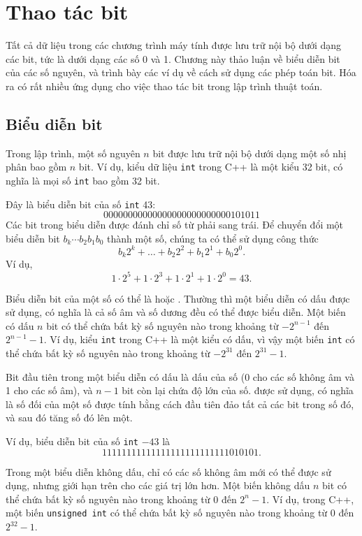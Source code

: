 \chapter{Thao tác bit}

Tất cả dữ liệu trong các chương trình máy tính được lưu trữ nội bộ dưới dạng các bit,
tức là dưới dạng các số 0 và 1.
Chương này thảo luận về biểu diễn bit
của các số nguyên, và trình bày các ví dụ
về cách sử dụng các phép toán bit.
Hóa ra có rất nhiều ứng dụng cho
việc thao tác bit trong lập trình thuật toán.

\section{Biểu diễn bit}


Trong lập trình, một số nguyên $n$ bit được lưu trữ nội bộ
dưới dạng một số nhị phân bao gồm $n$ bit.
Ví dụ, kiểu dữ liệu \texttt{int} trong C++ là
một kiểu 32 bit, có nghĩa là mọi số \texttt{int}
bao gồm 32 bit.

Đây là biểu diễn bit của
số \texttt{int} 43:
\[00000000000000000000000000101011\]
Các bit trong biểu diễn được đánh chỉ số từ phải sang trái.
Để chuyển đổi một biểu diễn bit $b_k \cdots b_2 b_1 b_0$ thành một số,
chúng ta có thể sử dụng công thức
\[b_k 2^k + \ldots + b_2 2^2 + b_1 2^1 + b_0 2^0.\]
Ví dụ,
\[1 \cdot 2^5 + 1 \cdot 2^3 + 1 \cdot 2^1 + 1 \cdot 2^0 = 43.\]

Biểu diễn bit của một số có thể là
 hoặc .
Thường thì một biểu diễn có dấu được sử dụng,
có nghĩa là cả số âm và số dương
đều có thể được biểu diễn.
Một biến có dấu $n$ bit có thể chứa bất kỳ
số nguyên nào trong khoảng từ $-2^{n-1}$ đến $2^{n-1}-1$.
Ví dụ, kiểu \texttt{int} trong C++ là
một kiểu có dấu, vì vậy một biến \texttt{int} có thể chứa bất kỳ
số nguyên nào trong khoảng từ $-2^{31}$ đến $2^{31}-1$.

Bit đầu tiên trong một biểu diễn có dấu
là dấu của số (0 cho các số không âm
và 1 cho các số âm), và
$n-1$ bit còn lại chứa độ lớn của số.
 được sử dụng, có nghĩa là
số đối của một số được tính bằng cách đầu tiên
đảo tất cả các bit trong số đó,
và sau đó tăng số đó lên một.

Ví dụ, biểu diễn bit của
số \texttt{int} $-43$ là
\[11111111111111111111111111010101.\]

Trong một biểu diễn không dấu, chỉ có các số không âm
mới có thể được sử dụng, nhưng giới hạn trên cho các giá trị lớn hơn.
Một biến không dấu $n$ bit có thể chứa bất kỳ
số nguyên nào trong khoảng từ $0$ đến $2^n-1$.
Ví dụ, trong C++, một biến \texttt{unsigned int}
có thể chứa bất kỳ số nguyên nào trong khoảng từ $0$ đến $2^{32}-1$.


